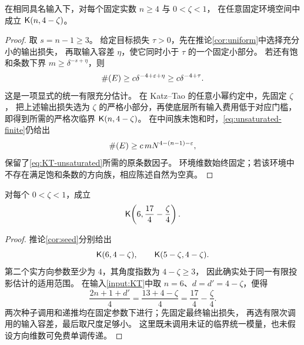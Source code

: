 \begin{corollary}[任意固定实方向参数的种子]\label{cor:seed}
在相同具名输入下，对每个固定实数 $n\ge4$ 与 $0<\zeta<1$，
在任意固定环境空间中成立 $\mathsf K(n,4-\zeta)$。
\end{corollary}

\begin{proof}
取 $s=n-1\ge3$。
给定目标损失 $\tau>0$，先在推论\ref{cor:uniform}中选择充分小的输出损失，
再取输入容差 $\eta$，使它同时小于 $\tau$ 的一个固定小部分。
若还有饱和条数下界 $m\ge\delta^{-s+\eta}$，则
\[
 \#\!\left(E\right)\ge c\delta^{-4+\varepsilon+\eta}
            \ge c\delta^{-4+\tau}.
\]
这是一项显式的统一有限充分估计。
在 Katz--Tao 的任意小幂约定中，先固定 $\zeta$，
把上述输出损失选为 $\zeta$ 的严格小部分，再使底层所有输入费用低于对应门槛，
即得到所需的严格次临界 $\mathsf K(n,4-\zeta)$。
在中间族未饱和时，\eqref{eq:unsaturated-finite}仍给出
\[
 \#\!\left(E\right)\ge c\,mN^{4-(n-1)-\varepsilon},
\]
保留了\eqref{eq:KT-unsaturated}所需的原条数因子。
环境维数始终固定；若该环境中不存在满足饱和条数的方向族，相应陈述自然为空真。
\end{proof}

\begin{proposition}[真实的六维参数代入]\label{prop:six}
对每个 $0<\zeta<1$，成立
\begin{equation}\label{eq:six-finite}
 \mathsf K\!\left(6,\frac{17}{4}-\frac{\zeta}{4}\right).
\end{equation}
\end{proposition}

\begin{proof}
推论\ref{cor:seed}分别给出
\[
 \mathsf K(6,4-\zeta),\qquad \mathsf K(5-\zeta,4-\zeta).
\]
第二个实方向参数至少为 $4$，其角度指数为 $4-\zeta\ge3$，
因此确实处于同一有限投影估计的适用范围。
在输入\ref{input:KT}中取 $n=6$、$d=d'=4-\zeta$，便得
\[
 \frac{2n+1+d'}4=\frac{13+4-\zeta}{4}
                  =\frac{17}{4}-\frac\zeta4.
\]
两次种子调用和递推均在固定参数下进行；先固定最终输出损失，
再选有限次调用的输入容差，最后取尺度足够小。
这里既未调用未证的临界统一模量，也未假设方向维数可免费单调传递。
\end{proof}
